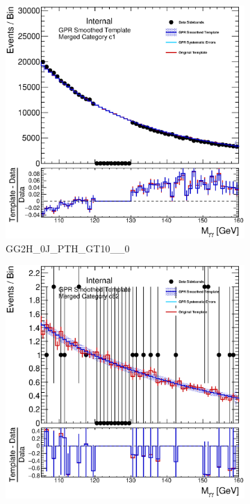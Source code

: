 \begin{figure}[h!]
        \begin{subfigure}[T]{0.49\linewidth}
                \centering
                \includegraphics[width=\linewidth,page=1]{figures/background/gpr/coupCatTemplates/GPR_Smoothed_Plot_hmgg_c1.eps}
                \caption{GG2H\_0J\_PTH\_GT10\_\_0}
        \end{subfigure}
        \begin{subfigure}[T]{0.49\linewidth}
                \centering
                \includegraphics[width=\linewidth,page=1]{figures/background/gpr/coupCatTemplates/GPR_Smoothed_Plot_hmgg_c82.eps}

\end{subfigure}
\end{figure}
